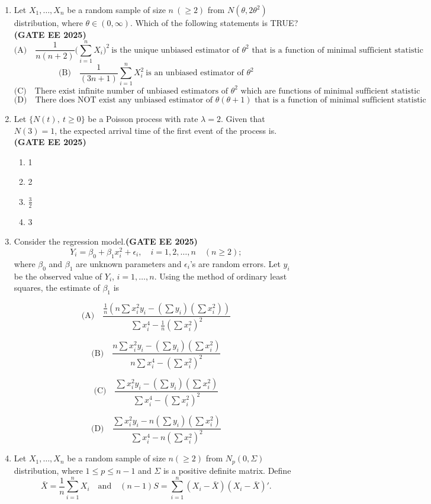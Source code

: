 \documentclass[journal,12pt,onecolumn]{IEEEtran}
\theoremstyle{remark}
\begin{document}
\begin{enumerate}
\item Let $X_{1}, \ldots, X_{n}$ be a random sample of size $n \ (\geq 2)$ from $N(\theta, 2\theta^2)$ distribution, where $\theta \in (0, \infty)$. Which of the following statements is TRUE? \hfill \textbf{(GATE EE 2025)}
\[
\text{(A)} \quad \frac{1}{n(n+2)} \Big(\sum_{i=1}^n X_i \Big)^2 \ \text{is the unique unbiased estimator of } \theta^2 \text{ that is a function of minimal sufficient statistic}
\]
\[
\text{(B)} \quad \frac{1}{(3n+1)} \sum_{i=1}^n X_i^2 \ \text{is an unbiased estimator of } \theta^2
\]
\[
\text{(C)} \quad \text{There exist infinite number of unbiased estimators of } \theta^2 \text{ which are functions of minimal sufficient statistic}
\]
\[
\text{(D)} \quad \text{There does NOT exist any unbiased estimator of } \theta(\theta+1) \text{ that is a function of minimal sufficient statistic}
\]


\item Let $\{N(t), \ t \geq 0\}$ be a Poisson process with rate $\lambda = 2$. Given that $N(3) = 1$, the expected arrival time of the first event of the process is.\hfill \textbf{(GATE EE 2025)}
\begin{enumerate}
    \item 1
    \item 2
    \item $\frac{3}{2}$
    \item 3
\end{enumerate}


\item Consider the regression model.\hfill \textbf{(GATE EE 2025)}
\[
Y_i = \beta_0 + \beta_1 x_i^2 + \epsilon_i, \quad i=1,2,\ldots,n \quad (n \geq 2);
\]
where $\beta_0$ and $\beta_1$ are unknown parameters and $\epsilon_i$'s are random errors.  
Let $y_i$ be the observed value of $Y_i$, $i=1,\ldots,n$. Using the method of ordinary least squares, the estimate of $\beta_1$ is

\[
\text{(A)} \quad \frac{\tfrac{1}{n}\left(n \sum x_i^2 y_i - (\sum y_i)(\sum x_i^2)\right)}{\sum x_i^4 - \tfrac{1}{n}(\sum x_i^2)^2}
\]

\[
\text{(B)} \quad \frac{n \sum x_i^2 y_i - (\sum y_i)(\sum x_i^2)}{n \sum x_i^4 - (\sum x_i^2)^2}
\]

\[
\text{(C)} \quad \frac{\sum x_i^2 y_i - (\sum y_i)(\sum x_i^2)}{\sum x_i^4 - (\sum x_i^2)^2}
\]

\[
\text{(D)} \quad \frac{\sum x_i^2 y_i - n(\sum y_i)(\sum x_i^2)}{\sum x_i^4 - n(\sum x_i^2)^2}
\]

\item Let $X_1, \ldots, X_n$ be a random sample of size $n (\geq 2)$ from $N_p(0,\Sigma)$ distribution, where $1 \leq p \leq n-1$ and $\Sigma$ is a positive definite matrix. Define
\[
\bar{X} = \frac{1}{n} \sum_{i=1}^n X_i 
\quad \text{and} \quad 
(n-1)S = \sum_{i=1}^n (X_i - \bar{X})(X_i - \bar{X})'.
\]


\end{enumerate}
\end{document}

